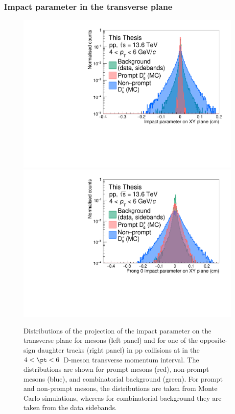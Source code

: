 \subsubsection{Impact parameter in the transverse plane}
\begin{figure}[tb]
    \centering
    \includegraphics[width=0.48\linewidth]{Figures/Chapter 4/ImpactParameterXY.pdf}
    \includegraphics[width=0.48\linewidth]{Figures/Chapter 4/ImpactParameter0.pdf}
    \caption{Distributions of the projection of the impact parameter on the transverse plane for \ds mesons (left panel) and for one of the opposite-sign daughter tracks (right panel) in pp collisions at \thirteen in the $4 < \pt < 6$~\gevc D-meson transverse momentum interval. The distributions are shown for prompt \ds mesons (red), non-prompt \ds mesons (blue), and combinatorial background (green). For prompt and non-prompt \ds mesons, the distributions are taken from Monte Carlo simulations, whereas for combinatorial background they are taken from the data sidebands. }
    \label{fig:ImpactParameter}
\end{figure}
